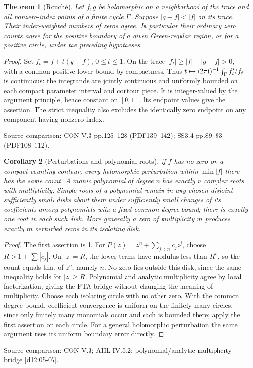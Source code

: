 \documentclass[11pt,a4paper,openany]{book}
\newtheorem{theorem}{Theorem}[chapter]
\newtheorem{corollary}[theorem]{Corollary}
\theoremstyle{definition}
\theoremstyle{remark}\newtheorem{remark}[theorem]{Remark}
\newcommand{\family}[1]{}
\newcommand{\source}[1]{\par\begingroup\small\sffamily\color{black!65}Source comparison: #1\par\endgroup}
\begin{document}
\begin{theorem}[Rouch\'e]\family{D12.09.03}\label{d12:09-03}
Let $f,g$ be holomorphic on a neighborhood of the trace and all nonzero-index points of a finite cycle $\Gamma$. Suppose $|g-f|<|f|$ on its trace. Their index-weighted numbers of zeros agree. In particular their ordinary zero counts agree for the positive boundary of a given Green-regular region, or for a positive circle, under the preceding hypotheses.
\end{theorem}
\begin{proof}
Set $f_t=f+t(g-f)$, $0\le t\le1$. On the trace $|f_t|\ge |f|-|g-f|>0$, with a common positive lower bound by compactness. Thus $t\mapsto(2\pi\mathrm i)^{-1}\int_\Gamma f_t'/f_t$ is continuous: the integrands are jointly continuous and uniformly bounded on each compact parameter interval and contour piece. It is integer-valued by the argument principle, hence constant on $[0,1]$. Its endpoint values give the assertion. The strict inequality also excludes the identically zero endpoint on any component having nonzero index.
\end{proof}
\source{CON V.3 pp.125--128 (PDF139--142); SS3.4 pp.89--93 (PDF108--112).}

\begin{corollary}[Perturbations and polynomial roots]\family{D12.09.04}\label{d12:09-04}
If $f$ has no zero on a compact counting contour, every holomorphic perturbation within $\min|f|$ there has the same count. A monic polynomial of degree $n$ has exactly $n$ complex roots with multiplicity. Simple roots of a polynomial remain in any chosen disjoint sufficiently small disks about them under sufficiently small changes of its coefficients among polynomials with a fixed common degree bound; there is exactly one root in each such disk. More generally a zero of multiplicity $m$ produces exactly $m$ perturbed zeros in its isolating disk.
\end{corollary}
\begin{proof}
The first assertion is \cref{d12:09-03}. For $P(z)=z^n+\sum_{j<n}c_jz^j$, choose $R>1+\sum|c_j|$. On $|z|=R$, the lower terms have modulus less than $R^n$, so the count equals that of $z^n$, namely $n$. No zero lies outside this disk, since the same inequality holds for $|z|\ge R$. Polynomial and analytic multiplicity agree by local factorization, giving the FTA bridge without changing the meaning of multiplicity. Choose each isolating circle with no other zero. With the common degree bound, coefficient convergence is uniform on the finitely many circles, since only finitely many monomials occur and each is bounded there; apply the first assertion on each circle. For a general holomorphic perturbation the same argument uses its uniform boundary error directly.
\end{proof}
\source{CON V.3; AHL IV.5.2; polynomial/analytic multiplicity bridge \cref{d12:05-07}.}
\end{document}
